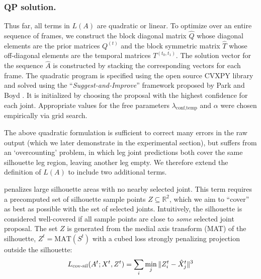   \subsubsection*{QP solution.}
  Thus far, all terms in $L(A)$ are quadratic or linear.
  To optimize over an entire sequence of frames, we construct the block diagonal matrix $\hat{Q}$ whose diagonal elements are the prior matrices $Q^{(t)}$ and the block symmetric matrix $\hat{T}$ whose off-diagonal elements are the temporal matrices $T^{(t_0, t_1)}$. The solution vector for the sequence $\hat{A}$ is constructed by stacking the corresponding vectors for each frame. The quadratic program is specified using the open source CVXPY library \cite{diamond2016cvxpy} and solved using the ``\emph{Suggest-and-Improve}'' framework proposed by Park and Boyd \cite{park2017general}. It is initialized by choosing the proposal with the highest confidence for each joint. Appropriate values for the free parameters $\lambda_{\text{conf}, \text{temp}}$ and $\alpha$ were chosen empirically via grid search. 
  
  The above quadratic formulation is sufficient to correct many errors in the raw output (which we later demonstrate in the experimental section), but suffers from an `overcounting' problem, in which leg joint predictions both cover the same silhouette leg region, leaving another leg empty. We therefore extend the definition of $L(A)$ to include two additional terms. 
  
  \def\silhouette{S}
  
   penalizes large silhouette areas with no nearby selected joint. This term requires a precomputed set of silhouette sample points $Z \subseteq \mathbb{R}^2$, which we aim to ``cover'' as best as possible with the set of selected joints. Intuitively, the silhouette is considered well-covered if all sample points are close to \emph{some} selected joint proposal. The set $Z$ is generated from the medial axis transform (MAT)\cite{blum1967transformation} of the silhouette, $Z^{t} = \text{MAT}(\silhouette^{t})$
  with a cubed loss strongly penalizing projection outside the silhouette:
  \begin{equation}
  L_{\text{cov-sil}}(A^{t};X^{t},Z^{t}) = \sum_{i}\min_{j}\|Z_{i}^{t} - \hat{X}_{j}^{t}\|^3
  \end{equation}
  
